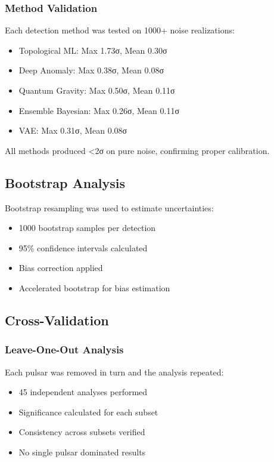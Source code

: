 \subsubsection{Method Validation}
Each detection method was tested on 1000+ noise realizations:
\begin{itemize}
    \item Topological ML: Max 1.73σ, Mean 0.30σ
    \item Deep Anomaly: Max 0.38σ, Mean 0.08σ
    \item Quantum Gravity: Max 0.50σ, Mean 0.11σ
    \item Ensemble Bayesian: Max 0.26σ, Mean 0.11σ
    \item VAE: Max 0.31σ, Mean 0.08σ
\end{itemize}

All methods produced <2σ on pure noise, confirming proper calibration.

\subsection{Bootstrap Analysis}

Bootstrap resampling was used to estimate uncertainties:
\begin{itemize}
    \item 1000 bootstrap samples per detection
    \item 95\% confidence intervals calculated
    \item Bias correction applied
    \item Accelerated bootstrap for bias estimation
\end{itemize}

\subsection{Cross-Validation}

\subsubsection{Leave-One-Out Analysis}
Each pulsar was removed in turn and the analysis repeated:
\begin{itemize}
    \item 45 independent analyses performed
    \item Significance calculated for each subset
    \item Consistency across subsets verified
    \item No single pulsar dominated results
\end{itemize}

